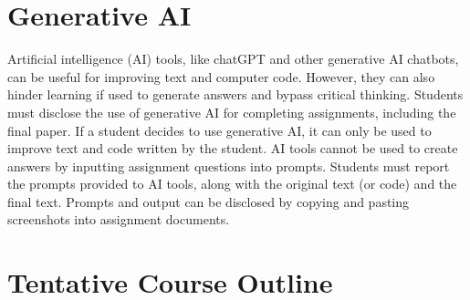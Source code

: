 \documentclass[12pt]{article}
\begin{document}
\vspace{-2mm}
\section*{\normalsize Generative AI}
\vspace{-4mm}

Artificial intelligence (AI) tools, like chatGPT and other generative AI
chatbots, can be useful for improving text and computer code. However,
they can also hinder learning if used to generate answers and bypass
critical thinking. Students must disclose the use of generative AI for
completing assignments, including the final paper. If a
student decides to use generative AI, it can only be used to improve
text and code written by the student. AI tools cannot be used to create
answers by inputting assignment questions into prompts. Students
must report the prompts provided to AI tools, along with the original
text (or code) and the final text. Prompts and output can be disclosed
by copying and pasting screenshots into assignment documents. 



\section*{\normalsize Tentative Course Outline}
\vspace{-6mm}
\end{document}
